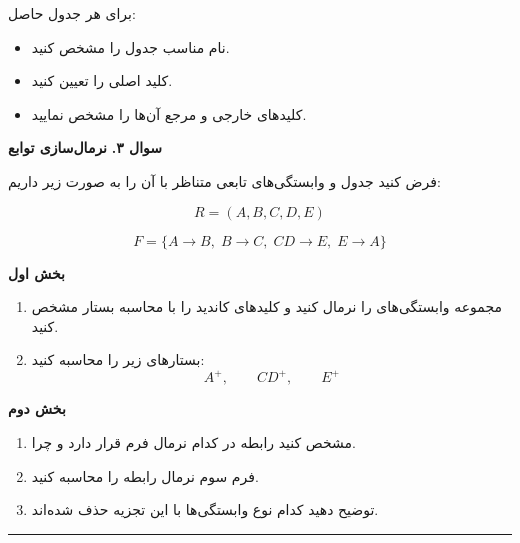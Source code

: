 \documentclass[12pt,a4paper]{article}
\newcommand{\questiontitle}[2]{%
  \vspace{0.4em}
  \noindent
  \colorbox{boxgray}{%
    \parbox{\dimexpr\textwidth-2\fboxsep\relax}{%
      \textbf{سوال #1.} \hfill \textbf{#2}
    }%
  }
  \vspace{0.4em}
}
\newcommand{\subheading}[1]{%
  \vspace{0.35em}
  \textbf{#1}
  \vspace{0.15em}
}
\newcommand{\answerspace}[1]{%
  \vspace{0.35em}
  \noindent\textcolor{rulegray}{\rule{\textwidth}{0.5pt}}
  \vspace{#1}
}
\begin{document}
برای هر جدول حاصل:
\begin{itemize}
\item نام مناسب جدول را مشخص کنید.
\item کلید اصلی  را تعیین کنید.
\item کلیدهای خارجی  و مرجع آن‌ها را مشخص نمایید.
\end{itemize}

\newpage

\questiontitle{۳}{نرمال‌سازی توابع}

فرض کنید جدول و وابستگی‌های تابعی متناظر با آن را به صورت زیر داریم:

\[
R = (A, B, C, D, E)
\]

\[
F = \{ A \rightarrow B,\; B \rightarrow C,\; CD \rightarrow E,\; E \rightarrow A \}
\]

\subheading{بخش اول}
\begin{enumerate}
\item مجموعه وابستگی‌های  را نرمال کنید و کلیدهای کاندید  را با محاسبه بستار مشخص کنید.
\item بستارهای زیر را محاسبه کنید:
\[
A^+,\qquad CD^+,\qquad E^+
\]
\end{enumerate}

\subheading{بخش دوم}
\begin{enumerate}
\item مشخص کنید رابطه  در کدام نرمال فرم قرار دارد و چرا.
\item فرم سوم نرمال  رابطه  را محاسبه کنید.
\item توضیح دهید کدام نوع وابستگی‌ها با این تجزیه حذف شده‌اند.
\end{enumerate}

\answerspace{10cm}
\end{document}
